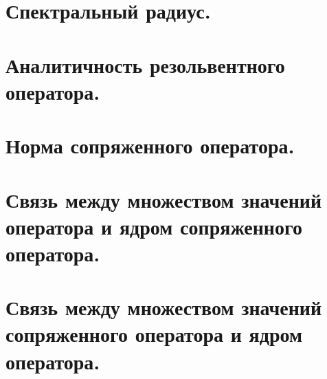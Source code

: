 \documentclass{article}
\begin{document}
\begin{sloppypar}
\section{Спектральный радиус.}

\section{Аналитичность резольвентного оператора.}

\section{Норма сопряженного оператора.}

\section{Связь между множеством значений оператора и ядром сопряженного оператора.}

\section{Связь между множеством значений сопряженного оператора и ядром оператора.}

\end{sloppypar}
\end{document}
